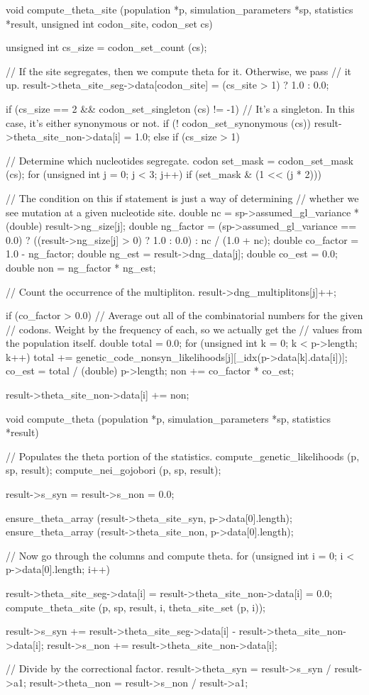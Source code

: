 \documentclass{article}
\begin{document}
\begin{ccode}
void compute_theta_site (population *p, simulation_parameters *sp, statistics *result,
			 unsigned int codon_site, codon_set cs) {
    unsigned int cs_size = codon_set_count (cs);

    // If the site segregates, then we compute theta for it. Otherwise, we pass
    // it up.
    result->theta_site_seg->data[codon_site] = (cs_site > 1) ? 1.0 : 0.0;

    if (cs_size == 2 && codon_set_singleton (cs) != -1) {
      // It's a singleton. In this case, it's either synonymous or not.
      if (! codon_set_synonymous (cs))
	result->theta_site_non->data[i] = 1.0;
    } else if (cs_size > 1) {
      // Determine which nucleotides segregate.
      codon set_mask = codon_set_mask (cs);
      for (unsigned int j = 0; j < 3; j++)
	if (set_mask & (1 << (j * 2))) {
	  // The condition on this if statement is just a way of determining
	  // whether we see mutation at a given nucleotide site.
	  double nc        = sp->assumed_gl_variance * (double) result->ng_size[j];
	  double ng_factor = (sp->assumed_gl_variance == 0.0) ?
			       ((result->ng_size[j] > 0) ? 1.0 : 0.0) :
			       nc / (1.0 + nc);
	  double co_factor = 1.0 - ng_factor;
	  double ng_est    = result->dng_data[j];
	  double co_est    = 0.0;
	  double non       = ng_factor * ng_est;

	  // Count the occurrence of the multipliton.
	  result->dng_multiplitons[j]++;

	  if (co_factor > 0.0) {
	    // Average out all of the combinatorial numbers for the given
	    // codons. Weight by the frequency of each, so we actually get the
	    // values from the population itself.
	    double total = 0.0;
	    for (unsigned int k = 0; k < p->length; k++)
	      total += genetic_code_nonsyn_likelihoods[j][_idx(p->data[k].data[i])];
	    co_est = total / (double) p->length;
	    non += co_factor * co_est;
	  }

	  result->theta_site_non->data[i] += non;
	}
    }

}

void compute_theta (population *p, simulation_parameters *sp, statistics *result) {
  // Populates the theta portion of the statistics.
  compute_genetic_likelihoods (p, sp, result);
  compute_nei_gojobori (p, sp, result);
  
  result->s_syn = result->s_non = 0.0;

  ensure_theta_array (result->theta_site_syn, p->data[0].length);
  ensure_theta_array (result->theta_site_non, p->data[0].length);

  // Now go through the columns and compute theta.
  for (unsigned int i = 0; i < p->data[0].length; i++) {
    result->theta_site_seg->data[i] = result->theta_site_non->data[i] = 0.0;
    compute_theta_site (p, sp, result, i, theta_site_set (p, i));
    
    result->s_syn += result->theta_site_seg->data[i] - result->theta_site_non->data[i];
    result->s_non += result->theta_site_non->data[i];
  }

  // Divide by the correctional factor.
  result->theta_syn = result->s_syn / result->a1;
  result->theta_non = result->s_non / result->a1;
}
\end{ccode}
\end{document}
